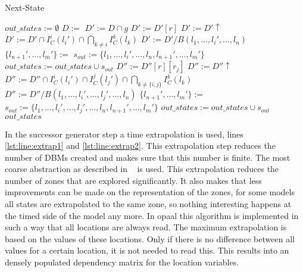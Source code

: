 \begin{algorithm}
\caption{Next-State}\label{alg:successor-gen}
\begin{algorithmic}[1]
	\State $out\_states := \emptyset$	
	\State $D := $		
	\State {}
	 \label{lst:line:alllocs}
		 \label{lst:line:alltrans}
			\State $D' := D \cap g$
			\label{lst:line:empty1}
				 \label{lst:line:normaltrans}
					\State $D' := D'[r]$
					\State $D' := D'\uparrow$
					\State $D' := D' \cap I_C^i(l_i') \cap \bigcap_{k \neq i} I_C^k(l_k)$
					\label{lst:line:empty2}
						\State $D' := D'/ B(l_1,...,l_i',...,l_n)$\label{lst:line:extrap1}
						\State \Call{ReduceZero}{$D'$}
						\State $\{l_{n+1}',...,l_m'\} := $
						\State $s_{out} := \{l_1,...,l_i',...,l_n,l_{n+1}',...,l_m'\}$
						\State $out\_states := out\_states \cup s_{out}$
					\EndIf \label{lst:line:endnormaltrans}
				\Else
					 \label{lst:line:synctrans}
						\label{lst:line:alllocs2}
								\label{lst:line:empty3}
									\State $D'' := D''[r][r_j]$
									\State $D'' := D''\uparrow$
									\State $D'' := D'' \cap I_C^i(l_i') \cap I_C^j(l_j') \cap \bigcap_{k \neq \{i,j\}} I_C^k(l_k)$
									\label{lst:line:empty4}
										\State $D''	:= D''/ B(l_1,...,l_i',...,l_j',...,l_n)$\label{lst:line:extrap2}						
										\State {}		
										\State $\{l_{n+1}',...,l_m'\} := $
										\State $s_{out} := \{l_1,...,l_i',...,l_j',...,l_n,l_{n+1}',...,l_m'\}$
										\State $out\_states := out\_states \cup s_{out}$
									\EndIf								
								\EndIf							
							\EndFor
						\EndFor \label{lst:line:endsynctrans}
					\EndIf
				\EndIf
			\EndIf
		\EndFor
	\EndFor
	\State \Return $out\_states$
\EndProcedure
\end{algorithmic}
\end{algorithm}
\label{subsec:extrapolation}
In the successor generator step a time extrapolation is used, lines \ref{lst:line:extrap1} and \ref{lst:line:extrap2}. This extrapolation step reduces the number of DBMs created and makes sure that this number is finite. The most coarse abstraction as described in ~\cite{Behrmann2004} is used. This extrapolation reduces the number of zones that are explored significantly. It also makes that less improvements can be made on the representation of the zones, for some models all states are extrapolated to the same zone, so nothing interesting happens at the timed side of the model any more. In opaal this algorithm is implemented in such a way that all \uppaal{} locations are always read. The maximum extrapolation is based on the values of these locations. Only if there is no difference between all values for a certain location, it is not needed to read this. This results into an densely populated dependency matrix for the location variables. 

